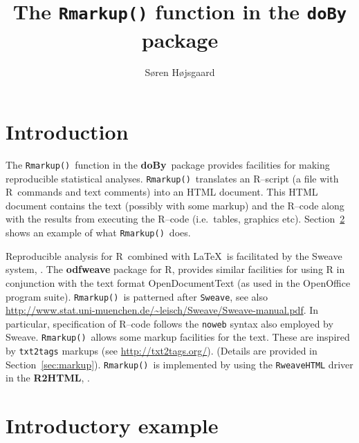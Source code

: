\documentclass[11pt]{article}
\title{The \texttt{Rmarkup()} function in the \texttt{doBy} package}
\author{S{\o}ren H{\o}jsgaard}
\begin{document}

\maketitle
\tableofcontents


\renewenvironment{Schunk}{\begin{center}
    \scriptsize
    \begin{boxedminipage}{0.95\textwidth}}{
    \end{boxedminipage}\end{center}}

\def\proglang#1{{#1}}
\def\pkg#1{{\bf #1}}
\def\doby{\pkg{doBy}}
\def\code#1{\texttt{#1}}
\def\shd#1{\footnote{SHD: #1}}
\def\rep{\code{Rmarkup()}}
\def\R{\proglang{R}}



\parindent0pt\parskip5pt

\section{Introduction}
\label{sec:introduction}

The \rep\ function in the \doby\ package provides facilities for
making reproducible statistical analyses. \rep\ translates an
\R--script (a file with \R\ commands and text comments) into an HTML
document. This HTML document contains the text (possibly with some
markup) and the \R--code along with the results from executing the
\R--code (i.e.\ tables, graphics etc). Section~\ref{sec:introexample}
shows an example of what \rep\ does.

Reproducible analysis for \R\ combined with \LaTeX\ is facilitated by
the Sweave system, \cite{Sweave}. The \pkg{odfweave} package for \R,
\cite{odfWeave} provides similar facilities for using R in conjunction
with the text format OpenDocumentText (as used in the OpenOffice
program suite).  \rep\ is patterned after \code{Sweave}, see also
\url{http://www.stat.uni-muenchen.de/~leisch/Sweave/Sweave-manual.pdf}. In
particular, specification of \R--code follows the \code{noweb} syntax
also employed by Sweave. \rep\ allows some markup facilities for the
text. These are inspired by \code{txt2tags} markups (see
\url{http://txt2tags.org/}). (Details are provided in
Section~\ref{sec:markup}). \rep\ is implemented by using the
\code{RweaveHTML} driver in the \pkg{R2HTML}, \cite{R2HTML}.


\section{Introductory example}
\label{sec:introexample}
\end{document}
